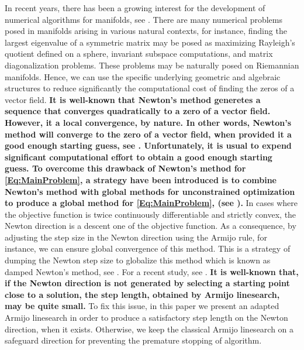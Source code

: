  In recent years, there has been a growing interest for the development of numerical algorithms for manifolds, see  \cite{bortoloti2022efficient,sato2021}.
There are many numerical problems posed in manifolds arising in various natural contexts, for instance, finding the largest eigenvalue of a symmetric matrix may be posed as maximizing Rayleigh's quotient defined on a sphere, invariant subspace computations, and matrix diagonalization problems.
These problems may be naturally posed on Riemannian manifolds.
Hence, we can use the specific underlying geometric and algebraic structures to reduce significantly the computational cost of finding the zeros of a vector field.
{\bf It is well-known that Newton's method generetes a sequence that converges quadratically to a zero of a vector field. However, it a local convergence, by nature. In other words, Newton's method will converge to the zero of a vector field, when provided it a good enough starting guess, see \cite{Ortega1990,Absil2009,Ferreira2012,FernandesAndFerreiraAndYuan2017}. Unfortunately, it is usual to expend significant computational effort to obtain a good enough starting guess. To overcome this drawback of Newton's method for \eqref{Eq:MainProblem}, a strategy have been introduced is to combine Newton's method with global methods for unconstrained optimization to produce a global method for \eqref{Eq:MainProblem}, (see \cite{MR4102428}).}
In cases where the objective function is twice continuously differentiable and strictly convex, the Newton direction is a descent one of the objective function.
As a consequence, by adjusting the step size in the Newton direction using the Armijo rule, for instance, we can ensure global convergence of this method.
This is a strategy of dumping the Newton step size to globalize this method which  is known as damped Newton's method, see \cite{Dennis1996,Bertsekas2014,Burdakov1980}.
For a recent study, see \cite{bortoloti2022efficient,MR4102428}. {\bf It is well-known that, if the Newton direction is not generated by selecting a starting point close to a solution, the step length, obtained by Armijo linesearch, may be quite small.}
To fix this issue, in this paper we present an adapted Armijo linesearch in order to produce a satisfactory step length on the Newton direction, when it exists.
Otherwise, we keep the classical Armijo linesearch on a safeguard direction for preventing the premature stopping of algorithm.
\vspace{0.2cm}

